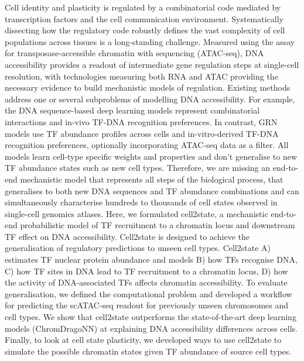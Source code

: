 Cell identity and plasticity is regulated by a combinatorial code mediated by transcription factors and the cell communication environment. Systematically dissecting how the regulatory code robustly defines the vast complexity of cell populations across tissues is a long-standing challenge. Measured using the assay for transposase-accessible chromatin with sequencing (ATAC-seq), DNA accessibility provides a readout of intermediate gene regulation steps at single-cell resolution, with technologies measuring both RNA and ATAC providing the necessary evidence to build mechanistic models of regulation. Existing methods address one or several subproblems of modelling DNA accessibility. For example, the DNA sequence-based deep learning models represent combinatorial interactions and in-vivo TF-DNA recognition preferences. In contrast, GRN models use TF abundance profiles across cells and in-vitro-derived TF-DNA recognition preferences, optionally incorporating ATAC-seq data as a filter. All models learn cell-type specific weights and properties and don’t generalise to new TF abundance states such as new cell types. Therefore, we are missing an end-to-end mechanistic model that represents all steps of the biological process, that generalises to both new DNA sequences and TF abundance combinations and can simultaneously characterise hundreds to thousands of cell states observed in single-cell genomics atlases. Here, we formulated cell2state, a mechanistic end-to-end probabilistic model of TF recruitment to a chromatin locus and downstream TF effect on DNA accessibility. Cell2state is designed to achieve the generalisation of regulatory predictions to unseen cell types. Cell2state A) estimates TF nuclear protein abundance and models B) how TFs recognise DNA, C) how TF sites in DNA lead to TF recruitment to a chromatin locus, D) how the activity of DNA-associated TFs affects chromatin accessibility. To evaluate generalisation, we defined the computational problem and developed a workflow for predicting the scATAC-seq readout for previously unseen chromosomes and cell types. We show that cell2state outperforms the state-of-the-art deep learning models (ChromDragoNN) at explaining DNA accessibility differences across cells. Finally, to look at cell state plasticity, we developed ways to use cell2state to simulate the possible chromatin states given TF abundance of source cell types.
\newpage
